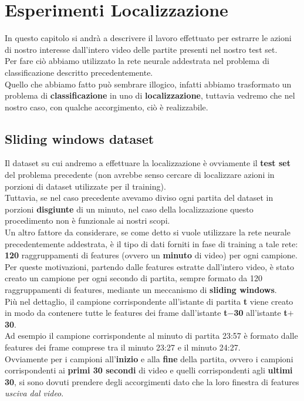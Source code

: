 \chapter{Esperimenti Localizzazione}\label{ch:chapter3}
In questo capitolo si andrà a descrivere il lavoro effettuato per estrarre le azioni di nostro interesse dall'intero video delle partite presenti nel nostro test set.
\\Per fare ciò abbiamo utilizzato la rete neurale addestrata nel problema di classificazione descritto precedentemente.
\\Quello che abbiamo fatto può sembrare illogico, infatti abbiamo trasformato un problema di \textbf{classificazione} in uno di \textbf{localizzazione}, tuttavia vedremo che nel nostro caso, con qualche accorgimento, ciò è realizzabile.
\section{Sliding windows dataset}
Il dataset su cui andremo a effettuare la localizzazione è ovviamente il \textbf{test set} del problema precedente (non avrebbe senso cercare di localizzare azioni in porzioni di dataset utilizzate per il training).
\\Tuttavia, se nel caso precedente avevamo diviso ogni partita del dataset in porzioni \textbf{disgiunte} di un minuto, nel caso della localizzazione questo procedimento non è funzionale ai nostri scopi.
\\Un altro fattore da considerare, se come detto si vuole utilizzare la rete neurale precedentemente addestrata, è  il tipo di dati forniti in fase di training a tale rete: \textbf{120} raggruppamenti di features (ovvero un \textbf{minuto} di video) per ogni campione.
\\Per queste motivazioni, partendo dalle features estratte dall'intero video, è stato creato un campione per ogni secondo di partita, sempre formato da 120 raggruppamenti di features, mediante un meccanismo di \textbf{sliding windows}.
\\Più nel dettaglio, il campione corrispondente all'istante di partita \textbf{t} viene creato in modo da contenere tutte le features dei frame dall'istante \textbf{t$-$30} all'istante \textbf{t$+$30}.
\\Ad esempio il campione corrispondente al minuto di partita 23:57 è formato dalle features dei frame comprese tra il minuto 23:27 e il minuto  24:27.
\\Ovviamente per i campioni all'\textbf{inizio} e alla \textbf{fine} della partita, ovvero i campioni corrispondenti ai \textbf{primi 30 secondi} di video e quelli corrispondenti agli \textbf{ultimi 30}, si sono dovuti prendere degli accorgimenti dato che la loro finestra di features \textit{usciva dal video}.
